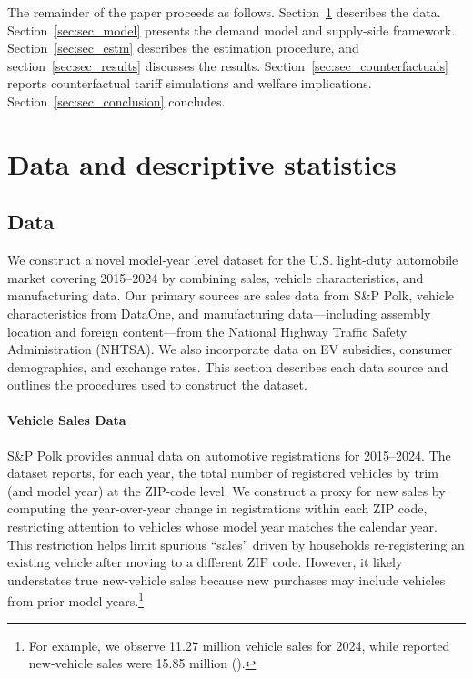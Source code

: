 \documentclass[11pt]{article}
\begin{document}
The remainder of the paper proceeds as follows. Section~\ref{sec:sec_data} describes the data. %
Section~\ref{sec:sec_model} presents the demand model and supply-side framework. Section~\ref{sec:sec_estm} describes the estimation procedure, and section~\ref{sec:sec_results} discusses the results. Section~\ref{sec:sec_counterfactuals} reports counterfactual tariff simulations and welfare implications. Section~\ref{sec:sec_conclusion} concludes.



\section{Data and descriptive statistics}\label{sec:sec_data}

\subsection{Data}
We construct a novel model-year level dataset for the U.S. light-duty automobile market covering 2015–2024 by combining sales, vehicle characteristics, and manufacturing data. Our primary sources are sales data from S\&P Polk, vehicle characteristics from DataOne, and manufacturing data—including assembly location and foreign content—from the National Highway Traffic Safety Administration (NHTSA). We also incorporate data on EV subsidies, consumer demographics, and exchange rates. This section describes each data source and outlines the procedures used to construct the dataset.


\paragraph{Vehicle Sales Data}
S\&P Polk provides annual data on automotive registrations for 2015--2024. The dataset reports, for each year, the total number of registered vehicles by trim (and model year) at the ZIP-code level. We construct a proxy for new sales by computing the year-over-year change in registrations within each ZIP code, restricting attention to vehicles whose model year matches the calendar year. This restriction helps limit spurious ``sales'' driven by households re-registering an existing vehicle after moving to a different ZIP code. However, it likely understates true new-vehicle sales because new purchases may include vehicles from prior model years.\footnote{For example, we observe 11.27 million vehicle sales for 2024, while reported new-vehicle sales were 15.85 million (\cite{wardsauto_most_2025}).}
\end{document}
